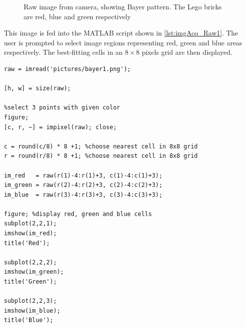 \documentclass[
a4paper,     %
11pt         %
]{scrartcl}  %
\begin{document}
\begin{figure}[ht]
\centering
{}
\caption{Raw image from camera, showing Bayer pattern. The Lego bricks are red, blue and green respectively}\label{fig:imgAcq_Raw}
\end{figure}

This image is fed into the MATLAB script shown in \cref{lst:imgAcq_Raw1}. The user is prompted to select image regions representing red, green and blue areas respectively. The best-fitting cells in an $8 \times 8$ pixels grid are then displayed.

\begin{lstlisting}[float,floatplacement=h!,label=lst:imgAcq_Raw1, caption=Matlab script to show bayer pattern of acquired image]
raw = imread('pictures/bayer1.png');

[h, w] = size(raw);

%select 3 points with given color
figure;
[c, r, ~] = impixel(raw); close;

c = round(c/8) * 8 +1; %choose nearest cell in 8x8 grid
r = round(r/8) * 8 +1; %choose nearest cell in 8x8 grid

im_red   = raw(r(1)-4:r(1)+3, c(1)-4:c(1)+3);
im_green = raw(r(2)-4:r(2)+3, c(2)-4:c(2)+3);
im_blue  = raw(r(3)-4:r(3)+3, c(3)-4:c(3)+3);

figure; %display red, green and blue cells
subplot(2,2,1);
imshow(im_red);
title('Red');

subplot(2,2,2);
imshow(im_green);
title('Green');

subplot(2,2,3);
imshow(im_blue);
title('Blue');
\end{lstlisting}
\end{document}
